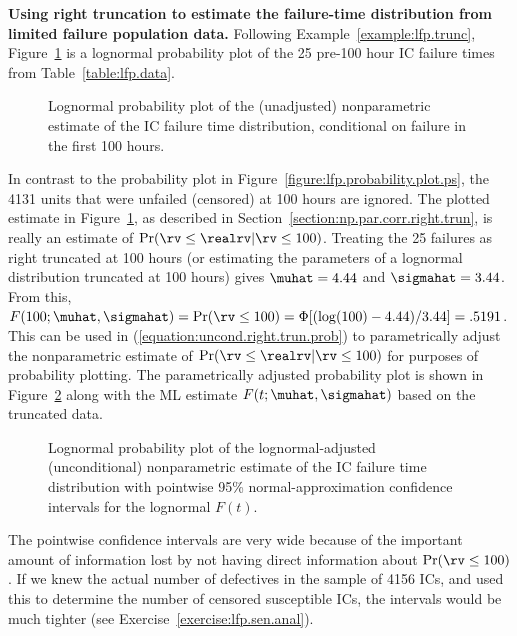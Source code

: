 \begin{example}
\label{example:lfp.trunc.mle}
{\bf Using right truncation to estimate the failure-time distribution
from limited failure population data.} Following
Example~\ref{example:lfp.trunc},
Figure~\ref{figure:lfptrunc.uncorrprobplot.lognor.ps} is a lognormal
probability plot of the 25 pre-100 hour IC failure times from
Table~\ref{table:lfp.data}.
\begin{figure}
\caption{Lognormal probability plot of the (unadjusted) nonparametric
estimate of the IC failure time distribution, conditional on failure
in the first 100 hours.}
\label{figure:lfptrunc.uncorrprobplot.lognor.ps}
\end{figure}
In contrast to the probability plot in
Figure~\ref{figure:lfp.probability.plot.ps}, the 4131 units that were
unfailed (censored) at 100 hours are ignored. The plotted estimate in
Figure~\ref{figure:lfptrunc.uncorrprobplot.lognor.ps}, as described in
Section~\ref{section:np.par.corr.right.trun}, is really an estimate of
$\Pr(\rv \leq \realrv | \rv \leq 100)$.  Treating the 25 failures as right
truncated at 100 hours (or estimating the parameters of a
lognormal distribution truncated at 100 hours) gives $\muhat=4.44$ and
$\sigmahat=3.44$.  From this, $F(100; \muhat,\sigmahat)=\Pr(\rv \leq 100)
= \Phi[(\log(100)-4.44)/3.44]= .5191$.  This can be used in
(\ref{equation:uncond.right.trun.prob}) to parametrically adjust the
nonparametric estimate of $\Pr(\rv \leq \realrv | \rv \leq 100)$ for
purposes of probability plotting. The parametrically adjusted
probability plot is shown in
Figure~\ref{figure:lfptrunc.corrprobplot.lognor.ps} along with the ML
estimate $F(t; \muhat,\sigmahat)$ based on the truncated data. 
\begin{figure}
\caption{Lognormal probability plot of 
the lognormal-adjusted (unconditional) nonparametric estimate of the
IC failure time distribution with pointwise 95\%
normal-approximation confidence intervals for the lognormal $F(t)$.}
\label{figure:lfptrunc.corrprobplot.lognor.ps}
\end{figure}
The
pointwise confidence intervals are very wide because of the important
amount of information lost by not having direct information about
$\Pr(\rv \leq  100)$. If we knew the actual number of defectives in the
sample of 4156 ICs, and used this to determine the number of censored
susceptible ICs, the intervals would be much tighter (see
Exercise~\ref{exercise:lfp.sen.anal}).
\end{example}

